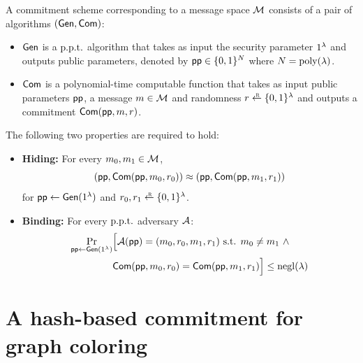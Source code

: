 \begin{definition} A commitment scheme corresponding to a message space ${\cal M}$ consists of a pair of algorithms $(\mathsf{Gen},\mathsf{Com})$:
\begin{itemize}
    \item $\mathsf{Gen}$ is a $\text{p.p.t.}$ algorithm that takes as input the security parameter $1^\lambda$ and outputs public parameters, denoted by $\mathsf{pp}\in\{0,1\}^N$ where $N=\operatorname{poly}(\lambda)$.
    \item $\mathsf{Com}$ is a polynomial-time computable function that takes as input public parameters $\mathsf{pp}$, a message $m\in{\cal M}$ and randomness $r\getsr\{0,1\}^\secp$ and outputs a commitment $\mathsf{Com}(\mathsf{pp},m,r)$.
\end{itemize}
The following two properties are required to hold: 
\begin{itemize}
    \item {\bf Hiding:} For every $m_0,m_1\in{\cal M}$,
    \[
    (\mathsf{pp},\mathsf{Com}(\mathsf{pp},m_0,r_0))\approx (\mathsf{pp},\mathsf{Com}(\mathsf{pp},m_1,r_1))
    \]
    for $\mathsf{pp}\gets\mathsf{Gen}(1^\lambda)$ and $r_0,r_1\getsr\{0,1\}^\secp$.
\item {\bf Binding:} For every $\text{p.p.t.}$ adversary $\mathcal{A}$:
\begin{equation}
\begin{aligned}
\Pr_{\mathsf{pp} \gets \mathsf{Gen}(1^\lambda)} & \Bigl[ \mathcal{A}(\mathsf{pp}) = (m_0, r_0, m_1, r_1) \text{ s.t. } m_0 \neq m_1 \ \wedge \\
& \mathsf{Com}(\mathsf{pp}, m_0, r_0) = \mathsf{Com}(\mathsf{pp}, m_1, r_1) \Bigr] \le \operatorname{negl}(\lambda)
\end{aligned}
\end{equation}
\end{itemize}
\end{definition}

\section{A hash-based commitment for graph coloring}

